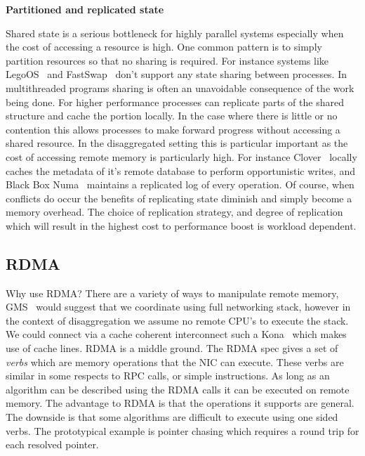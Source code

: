 \textbf{Partitioned and replicated state}

Shared state is a serious bottleneck for highly parallel systems especially when
the cost of accessing a resource is high. One common pattern is to simply
partition resources so that no sharing is required. For instance systems like
LegoOS~\cite{legoos} and FastSwap~\cite{fastswap} don't support any state
sharing between processes. In multithreaded programs sharing is often an
unavoidable consequence of the work being done. For higher performance processes
can replicate parts of the shared structure and cache the portion locally. In
the case where there is little or no contention this allows processes to make
forward progress without accessing a shared resource. In the disaggregated
setting this is particular important as the cost of accessing remote memory is
particularly high. For instance Clover~\cite{clover} locally caches the metadata
of it's remote database to perform opportunistic writes, and Black Box
Numa~\cite{black-box-numa} maintains a replicated log of every operation. Of
course, when conflicts do occur the benefits of replicating state diminish and
simply become a memory overhead. The choice of replication strategy, and degree
of replication which will result in the highest cost to performance boost is
workload dependent.


\subsection{RDMA}

Why use RDMA? There are a variety of ways to manipulate remote memory,
GMS~\cite{gms} would suggest that we coordinate using full networking stack,
however in the context of disaggregation we assume no remote CPU's to execute
the stack. We could connect via a cache coherent interconnect such a
Kona~\cite{kona} which makes use of cache lines. RDMA is a middle ground. The
RDMA spec gives a set of \textit{verbs} which are memory operations that the NIC
can execute. These verbs are similar in some respects to RPC calls, or simple
instructions. As long as an algorithm can be described using the RDMA calls it
can be executed on remote memory. The advantage to RDMA is that the operations
it supports are general. The downside is that some algorithms are difficult to
execute using one sided verbs. The prototypical example is pointer chasing
which requires a round trip for each resolved pointer.


